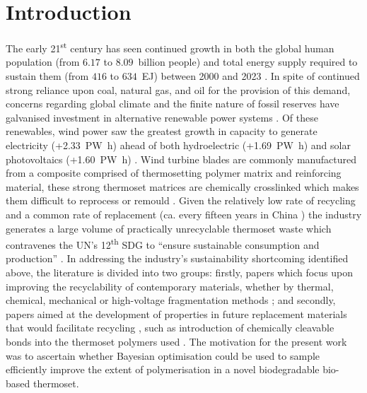 \section{Introduction}

The early 21\textsuperscript{st} century has seen continued growth in both
 the global human population (from \(6.17\) to \(8.09\)~billion people) and 
 total energy supply required to sustain them (from \(416\) to 
 \(634\)~\unit{\exa\joule}) between 2000 and 2023 
 \autocite{OWID20251027,UN20251027,IEA2025}.
In spite of continued strong reliance upon coal, natural gas, and oil for
 the provision of this demand, concerns regarding global climate and the
 finite nature of fossil reserves have galvanised investment in alternative
 renewable power systems \autocite{IEA2025,IPCC2021}.
Of these renewables, wind power saw the greatest growth in capacity to
 generate electricity (+2.33~\unit{\peta\watt\hour}) ahead of both
 hydroelectric (+1.69~\unit{\peta\watt\hour})
 and solar photovoltaics (+1.60~\unit{\peta\watt\hour}) \autocite{IEA20251027}.
Wind turbine blades are commonly manufactured from a composite 
 comprised of thermosetting polymer matrix and reinforcing material, these
 strong thermoset matrices are chemically crosslinked which makes them
 difficult to reprocess or remould \autocite{Ma2017}.
Given the relatively low rate of recycling and a common rate of 
 replacement (ca. every fifteen years in China \autocite{ChenJ2019}) the
 industry generates a large volume of practically unrecyclable thermoset
 waste which contravenes the UN's 12\textsuperscript{th} SDG to ``ensure
 sustainable consumption and production'' \autocite{UN2015}.
In addressing the industry's sustainability shortcoming identified above, the
 literature is divided into two groups: firstly, papers which focus upon
 improving the recyclability of contemporary materials, whether by thermal,
 chemical, mechanical or high-voltage fragmentation methods
 \autocite{Utekar2020,Beauson2016,ChenR2019}; and secondly, papers aimed at the 
 development of properties in future replacement materials that would 
 facilitate recycling \autocite{Liu2022}, such as introduction of chemically 
 cleavable bonds into the thermoset polymers used \autocite{Tesoro1990}.
The motivation for the present work was to ascertain whether Bayesian optimisation
 could be used to sample efficiently improve the extent of polymerisation
 in a novel biodegradable bio-based thermoset.

